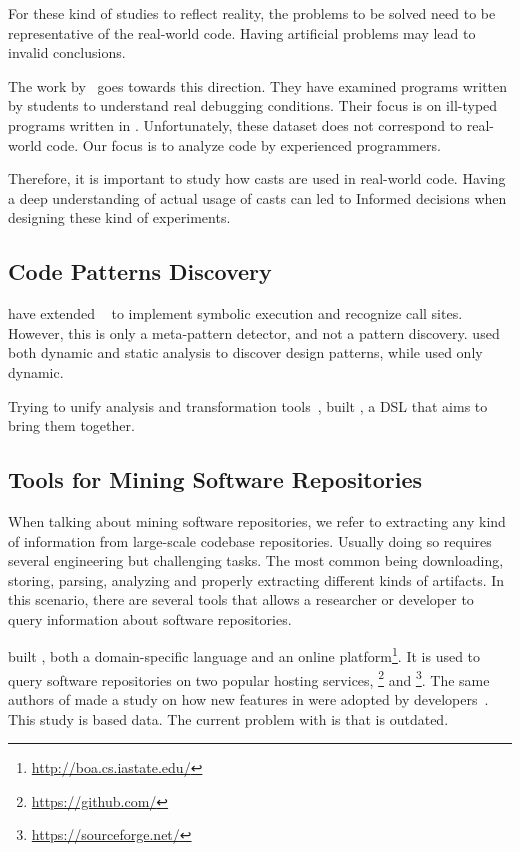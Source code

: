 For these kind of studies to reflect reality, the problems to be solved need to be representative of the real-world code. 
Having artificial problems may lead to invalid conclusions. 

The work by~\cite{wu_how_2017,wu_learning_2017} goes towards this direction. 
They have examined programs written by students to understand real debugging conditions. 
Their focus is on ill-typed programs written in \haskell{}. 
Unfortunately, these dataset does not correspond to real-world code. 
Our focus is to analyze code by experienced programmers. 

Therefore, it is important to study how casts are used in real-world code. 
Having a deep understanding of actual usage of casts can led to 
Informed decisions when designing these kind of experiments. 

\subsection{Code Patterns Discovery} \label{sec:rw:patterns}

\cite{posnett_thex:_2010} have extended \asm{}~\cite{bruneton_asm:_2002,kuleshov_using_2007} to implement symbolic execution and recognize call sites. 
However, this is only a meta-pattern detector, and not a pattern discovery. 
\cite{hu_dynamic_2008} used both dynamic and static analysis to discover design patterns, while \cite{arcelli_design_2008} used only dynamic. 

Trying to unify analysis and transformation tools~\cite{vinju_how_2006}, \cite{klint_rascal:_2009} built \rascal, a DSL that aims to bring them together.  

\subsection{Tools for Mining Software Repositories} \label{sec:rw:mining}

When talking about mining software repositories, we refer to extracting any kind of information from large-scale codebase repositories. 
Usually doing so requires several engineering but challenging tasks. 
The most common being downloading, storing, parsing, analyzing and properly extracting different kinds of artifacts. 
In this scenario, there are several tools that allows a researcher or developer to query information about software repositories. 

\cite{dyer_boa:_2013,dyer_declarative_2013} built \boa{}, both a domain-specific language and an online platform\footnote{\url{http://boa.cs.iastate.edu/}}. 
It is used to query software repositories on two popular hosting services, \github \footnote{\url{https://github.com/}} and \sourceforge \footnote{\url{https://sourceforge.net/}}. 
The same authors of \boa{} made a study on how new features in \java{} were adopted by developers~\cite{dyer_mining_2014}. 
This study is based \sourceforge{} data. 
The current problem with \sourceforge{} is that is outdated. 

